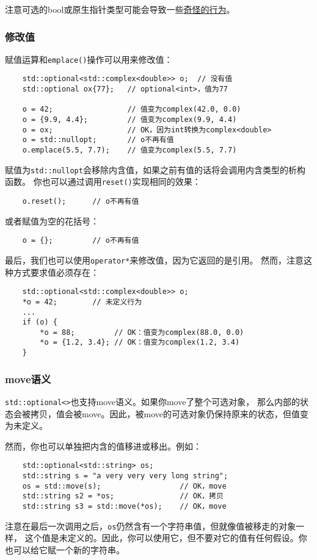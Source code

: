 注意可选的bool或原生指针类型可能会导致一些\hyperref[ch15.3.1]{奇怪的行为}。

\subsubsection{修改值}
赋值运算和\texttt{emplace()}操作可以用来修改值：
\begin{lstlisting}
    std::optional<std::complex<double>> o;  // 没有值
    std::optional ox{77};   // optional<int>，值为77

    o = 42;                 // 值变为complex(42.0, 0.0)
    o = {9.9, 4.4};         // 值变为complex(9.9, 4.4)
    o = ox;                 // OK，因为int转换为complex<double>
    o = std::nullopt;       // o不再有值
    o.emplace(5.5, 7.7);    // 值变为complex(5.5, 7.7)
\end{lstlisting}
赋值为\texttt{std::nullopt}会移除内含值，如果之前有值的话将会调用内含类型的析构函数。
你也可以通过调用\texttt{reset()}实现相同的效果：
\begin{lstlisting}
    o.reset();      // o不再有值
\end{lstlisting}
或者赋值为空的花括号：
\begin{lstlisting}
    o = {};         // o不再有值
\end{lstlisting}
最后，我们也可以使用\texttt{operator*}来修改值，因为它返回的是引用。
然而，注意这种方式要求值必须存在：
\begin{lstlisting}
    std::optional<std::complex<double>> o;
    *o = 42;        // 未定义行为
    ...
    if (o) {
        *o = 88;         // OK：值变为complex(88.0, 0.0)
        *o = {1.2, 3.4}; // OK：值变为complex(1.2, 3.4)
    }
\end{lstlisting}

\subsubsection{move语义}
\texttt{std::optional<>}也支持move语义。如果你move了整个可选对象，
那么内部的状态会被拷贝，值会被move。因此，被move的可选对象仍保持原来的状态，但值变为未定义。

然而，你也可以单独把内含的值移进或移出。例如：
\begin{lstlisting}
    std::optional<std::string> os;
    std::string s = "a very very very long string";
    os = std::move(s);                  // OK，move
    std::string s2 = *os;               // OK，拷贝
    std::string s3 = std::move(*os);    // OK，move
\end{lstlisting}
注意在最后一次调用之后，\texttt{os}仍然含有一个字符串值，但就像值被移走的对象一样，
这个值是未定义的。因此，你可以使用它，但不要对它的值有任何假设。你也可以给它赋一个新的字符串。

